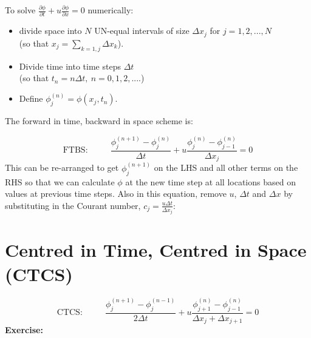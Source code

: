 \begin{minipage}[c]{0.48\columnwidth}%
To solve ${\displaystyle \frac{\partial\phi}{\partial t}+u\frac{\partial\phi}{\partial x}=0}$
numerically:
\begin{itemize}
\item divide space into $N$ UN-equal intervals of size $\Delta x_{j}$
for $j=1,2,...,N$ \\
(so that $x_{j}=\sum_{k=1,j}\Delta x_{k}$).
\item Divide time into time steps $\Delta t$\\
(so that $t_{n}=n\Delta t,~n=0,1,2,...$.)
\item Define $\phi_{j}^{(n)}=\phi(x_{j},t_{n})$.
\end{itemize}
The forward in time, backward in space scheme is:%
\end{minipage}\hfill{}%
\begin{minipage}[c]{0.48\columnwidth}%
\resizebox{1\textwidth}{!}{}%
\end{minipage}\pause

\begin{equation}
\text{FTBS:}~~~~~~~~~~~~\frac{\phi_{j}^{(n+1)}-\phi_{j}^{(n)}}{\Delta t}+u\frac{\phi_{j}^{(n)}-\phi_{j-1}^{(n)}}{\Delta x_{j}}=0\label{eqn:FTBS}
\end{equation}
\pause This can be re-arranged to get $\phi_{j}^{(n+1)}$ on the
LHS and all other terms on the RHS so that we can calculate $\phi$
at the new time step at all locations based on values at previous
time steps. Also in this equation, remove $u$, $\Delta t$ and $\Delta x$
by substituting in the Courant number, $c_{j}=\frac{u\Delta t}{\Delta x_{j}}$:

\clearpage{}


\section{Centred in Time, Centred in Space (CTCS)}


\paragraph*{
\begin{equation}
\text{CTCS:}~~~~~~~~~~~~\frac{\phi_{j}^{(n+1)}-\phi_{j}^{(n-1)}}{2\Delta t}+u\frac{\phi_{j+1}^{(n)}-\phi_{j-1}^{(n)}}{\Delta x_{j}+\Delta x_{j+1}}=0\label{eqn:CTCS}
\end{equation}
\pause Exercise:}

